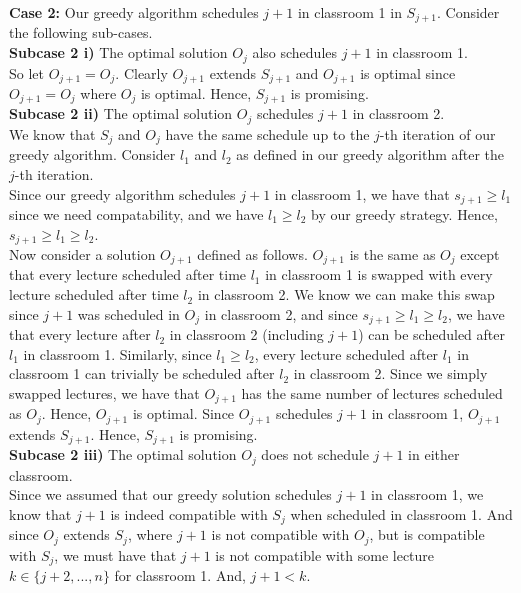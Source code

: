 \documentclass[12pt]{article}
\begin{document}
\textbf{Case 2:} Our greedy algorithm schedules $j+1$ in classroom 1 in $S_{j+1}$. Consider the following sub-cases. \\

\textbf{Subcase 2 i)} The optimal solution $O_j$ also schedules $j+1$ in classroom 1. \\

So let $O_{j+1} = O_j$. Clearly $O_{j+1}$ extends $S_{j+1}$ and $O_{j+1}$ is optimal since $O_{j+1} = O_j$ where $O_j$ is optimal. Hence, $S_{j+1}$ is promising. \\

\textbf{Subcase 2 ii)} The optimal solution $O_j$ schedules $j+1$ in classroom 2. \\

We know that $S_j$ and $O_j$ have the same schedule up to the $j$-th iteration of our greedy algorithm. Consider $l_1$ and $l_2$ as defined in our greedy algorithm after the $j$-th iteration. \\

Since our greedy algorithm schedules $j+1$ in classroom 1, we have that $s_{j+1} \geq l_1$ since we need compatability, and we have $l_1 \geq l_2$ by our greedy strategy. Hence, $s_{j+1} \geq l_1 \geq l_2$. \\

Now consider a solution $O_{j+1}$ defined as follows. $O_{j+1}$ is the same as $O_j$ except that every lecture scheduled after time $l_1$ in classroom 1 is swapped with every lecture scheduled after time $l_2$ in classroom 2. We know we can make this swap since $j+1$ was scheduled in $O_j$ in classroom 2, and since $s_{j+1} \geq l_1 \geq l_2$, we have that every lecture after $l_2$ in classroom 2 (including $j+1$) can be scheduled after $l_1$ in classroom 1. Similarly, since $l_1 \geq l_2$, every lecture scheduled after $l_1$ in classroom 1 can trivially be scheduled after $l_2$ in classroom 2. Since we simply swapped lectures, we have that $O_{j+1}$ has the same number of lectures scheduled as $O_j$. Hence, $O_{j+1}$ is optimal. Since $O_{j+1}$ schedules $j+1$ in classroom 1, $O_{j+1}$ extends $S_{j+1}$. Hence, $S_{j+1}$ is promising. \\

\textbf{Subcase 2 iii)} The optimal solution $O_j$ does not schedule $j+1$ in either classroom. \\

Since we assumed that our greedy solution schedules $j+1$ in classroom 1, we know that $j+1$ is indeed compatible with $S_j$ when scheduled in classroom 1. And since $O_j$ extends $S_j$, where $j+1$ is not compatible with $O_j$, but is compatible with $S_j$, we must have that $j+1$ is not compatible with some lecture $k \in \{j+2,...,n\}$ for classroom 1. And, $j+1 < k$. \\
\end{document}
